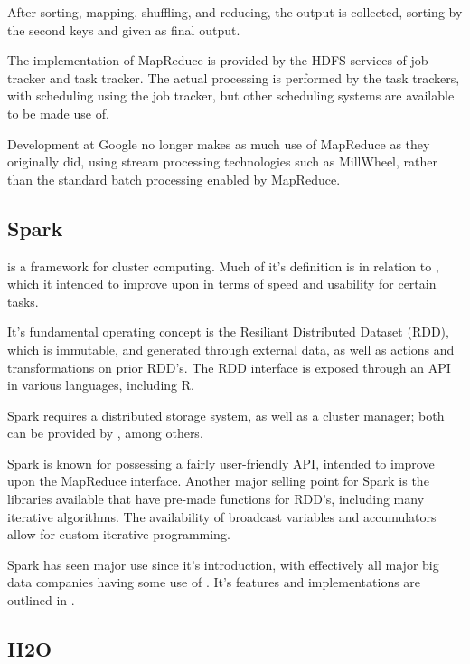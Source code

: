 After sorting, mapping, shuffling, and reducing, the output is
collected, sorting by the second keys and given as final output.

The implementation of MapReduce is provided by the HDFS services of job
tracker and task tracker. The actual processing is performed by the task
trackers, with scheduling using the job tracker, but other scheduling
systems are available to be made use of.

Development at Google no longer makes as much use of MapReduce as they
originally did, using stream processing technologies such as MillWheel,
rather than the standard batch processing enabled by
MapReduce\cite{akidau2013millwheel}.

\hypertarget{sec:spark}{%
    \subsection{Spark}\label{sec:spark}}

 is a framework for cluster computing\cite{zaharia2010spark}. Much
of it's definition is in relation to , which it intended to
improve upon in terms of speed and usability for certain tasks.

It's fundamental operating concept is the Resiliant Distributed Dataset
(RDD), which is immutable, and generated through external data, as well
as actions and transformations on prior RDD's. The RDD interface is
exposed through an API in various languages, including R.

Spark requires a distributed storage system, as well as a cluster
manager; both can be provided by , among others.

Spark is known for possessing a fairly user-friendly API, intended to
improve upon the MapReduce interface. Another major selling point for
Spark is the libraries available that have pre-made functions for RDD's,
including many iterative algorithms. The availability of broadcast
variables and accumulators allow for custom iterative programming.

Spark has seen major use since it's introduction, with effectively all
major big data companies having some use of . It's features and
implementations are outlined in \cite{zaharia2016apache}.

\hypertarget{sec:h2o}{%
    \subsection{H2O}\label{sec:h2o}}

